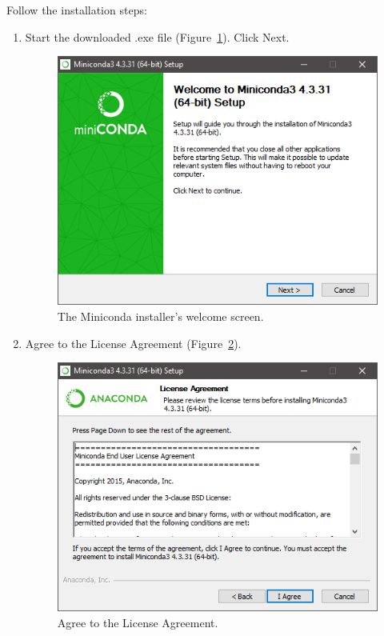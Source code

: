 \documentclass[11pt,a4paper]{article}
\begin{document}
Follow the installation steps:
\begin{enumerate}

\item Start the downloaded .exe file (Figure~\ref{fig:miniconda_install_1}). Click Next.
	\begin{figure}[H]
	\centering
	\includegraphics[scale=0.8]{miniconda_install_1.PNG}
	\caption{The Miniconda installer's welcome screen.}
	\label{fig:miniconda_install_1}
	\end{figure}
	
\newpage	
\item Agree to the License Agreement (Figure~\ref{fig:miniconda_install_license}).
	\begin{figure}[H]
	\centering
	\includegraphics[scale=0.8]{miniconda_install_license.PNG}
	\caption{Agree to the License Agreement.}
	\label{fig:miniconda_install_license}
	\end{figure}



\end{enumerate}
\end{document}
